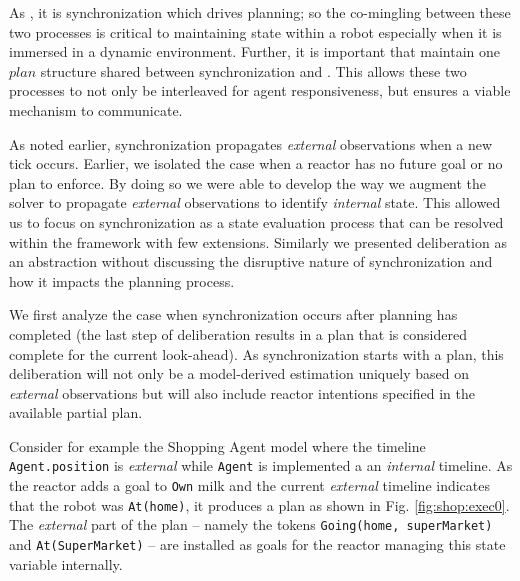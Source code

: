 As , it is
synchronization which drives planning; so the co-mingling between
these two processes is critical to maintaining state within a robot
especially when it is immersed in a dynamic environment. Further, it
is important that \rx maintain one $plan$ structure shared between
synchronization and . This allows these two
processes to not only be interleaved for agent responsiveness, but
ensures a viable mechanism to communicate.

As  noted earlier, synchronization propagates {\em
  external} observations when a new tick occurs. Earlier, we isolated
the case when a reactor has no future goal or no plan to enforce. By
doing so we were able to develop the way we augment the \eu solver to
propagate {\em external} observations to identify {\em internal}
state. This allowed us to focus on synchronization as a state
evaluation process that can be resolved within the \eu framework with
few extensions. Similarly we presented deliberation as an abstraction
without discussing the disruptive nature of synchronization and how it
impacts the planning process. 

We first analyze the case when synchronization occurs after planning
has completed (\ie the last step of deliberation results in a plan
that is considered complete for the current look-ahead). As
synchronization starts with a plan, this deliberation will not only be
a model-derived estimation uniquely based on {\em external}
observations but will also include reactor intentions specified in the
available partial plan.

Consider for example the Shopping Agent model where the timeline 
\texttt{Agent.position} is {\em external} while \texttt{Agent} is
implemented a an {\em internal} timeline. As the reactor adds a goal to
\texttt{Own} milk and the current {\em external} timeline indicates
that the robot was \texttt{At(home)}, it produces a plan as shown in
Fig. \ref{fig:shop:exec0}. The {\em external} part of the plan --
namely the tokens \texttt{Going(home, superMarket)} and
\texttt{At(SuperMarket)} -- are installed as goals for the reactor
managing this state variable internally.

